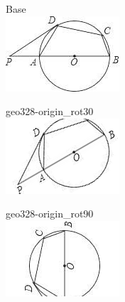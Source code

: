 \documentclass[12pt]{article}
\begin{document}
\begin{center}
\begin{minipage}{0.32\textwidth}\centering
Base\\
\includegraphics[width=0.95\linewidth]{out_rommath_origin/items/geo328-origin/assets/figure.png}
\end{minipage}
\hfill\begin{minipage}{0.32\textwidth}\centering
geo328-origin\_rot30\\
\includegraphics[width=0.95\linewidth]{out_rommath_origin/items/geo328-origin/assets/figure_rot30.png}
\end{minipage}
\hfill\begin{minipage}{0.32\textwidth}\centering
geo328-origin\_rot90\\
\includegraphics[width=0.95\linewidth]{out_rommath_origin/items/geo328-origin/assets/figure_rot90.png}

\end{minipage}
\end{center}
\end{document}
